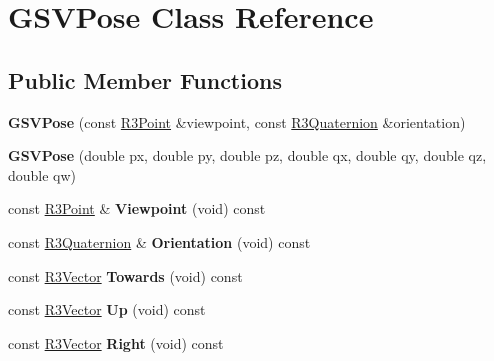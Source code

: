 \hypertarget{class_g_s_v_pose}{}\section{G\+S\+V\+Pose Class Reference}
\label{class_g_s_v_pose}
\subsection*{Public Member Functions}
\begin{DoxyCompactItemize}
\item 
{\bfseries G\+S\+V\+Pose} (const \hyperlink{class_r3_point}{R3\+Point} \&viewpoint, const \hyperlink{class_r3_quaternion}{R3\+Quaternion} \&orientation)\hypertarget{class_g_s_v_pose_ad0325ddef2d0e8fd88cb0c6acd9e4a3e}{}\label{class_g_s_v_pose_ad0325ddef2d0e8fd88cb0c6acd9e4a3e}

\item 
{\bfseries G\+S\+V\+Pose} (double px, double py, double pz, double qx, double qy, double qz, double qw)\hypertarget{class_g_s_v_pose_a76a8e7936aad12e9f6915cd102486103}{}\label{class_g_s_v_pose_a76a8e7936aad12e9f6915cd102486103}

\item 
const \hyperlink{class_r3_point}{R3\+Point} \& {\bfseries Viewpoint} (void) const \hypertarget{class_g_s_v_pose_a9475be2716846027f8b6e4f4fc8ed89e}{}\label{class_g_s_v_pose_a9475be2716846027f8b6e4f4fc8ed89e}

\item 
const \hyperlink{class_r3_quaternion}{R3\+Quaternion} \& {\bfseries Orientation} (void) const \hypertarget{class_g_s_v_pose_a235dc10a7609c320911549ac03fa0a70}{}\label{class_g_s_v_pose_a235dc10a7609c320911549ac03fa0a70}

\item 
const \hyperlink{class_r3_vector}{R3\+Vector} {\bfseries Towards} (void) const \hypertarget{class_g_s_v_pose_a861d9166c2e892e3c1a5881d5b396108}{}\label{class_g_s_v_pose_a861d9166c2e892e3c1a5881d5b396108}

\item 
const \hyperlink{class_r3_vector}{R3\+Vector} {\bfseries Up} (void) const \hypertarget{class_g_s_v_pose_af99b5e2fa5d1de0ff090566d5dad80fd}{}\label{class_g_s_v_pose_af99b5e2fa5d1de0ff090566d5dad80fd}

\item 
const \hyperlink{class_r3_vector}{R3\+Vector} {\bfseries Right} (void) const \hypertarget{class_g_s_v_pose_af39180d7dbd68159cbc35e8ca2f9dcf2}{}\label{class_g_s_v_pose_af39180d7dbd68159cbc35e8ca2f9dcf2}


\end{DoxyCompactItemize}
